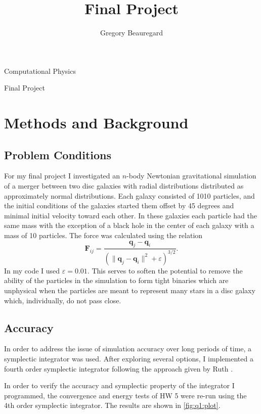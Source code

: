 \documentclass[%
  ,paper=letter
  ,abstract=on
  ,DIV=calc
  ,toc=bib
]{scrartcl}
\author{Gregory Beauregard}
\title{Final Project}
\date{\DTMdate{2016-16-23}} %
\begin{document}
\begin{flushright}
\MyAuthor

Computational Physics

Final Project

\MyDate
\end{flushright}

\section{Methods and Background}
\subsection{Problem Conditions}
For my final project I investigated an $n$-body Newtonian gravitational simulation of a merger between two disc galaxies with radial distributions distributed as approximately normal distributions. Each galaxy consisted of 1010 particles, and the initial conditions of the galaxies started them offset by 45 degrees and minimal initial velocity toward each other. In these galaxies each particle had the same mass with the exception of a black hole in the center of each galaxy with a mass of 10 particles. The force was calculated using the relation
\begin{equation}
\mathbf{F}_{ij}=\frac{\mathbf{q}_j-\mathbf{q}_i}{\left(\lVert \mathbf{q}_j-\mathbf{q}_i\rVert^2+\varepsilon\right)^{3/2}}.
\end{equation}
In my code I used $\varepsilon=0.01$. This serves to soften the potential to remove the ability of the particles in the simulation to form tight binaries which are unphysical when the particles are meant to represent many stars in a disc galaxy which, individually, do not pass close.

\subsection{Accuracy}
In order to address the issue of simulation accuracy over long periods of time, a symplectic integrator was used. After exploring several options, I implemented a fourth order symplectic integrator following the approach given by Ruth \autocite{symplectic}.

In order to verify the accuracy and symplectic property of the integrator I programmed, the convergence and energy tests of HW 5 were re-run using the 4th order symplectic integrator. The results are shown in \cref{fig:q1:plot}.
\end{document}
